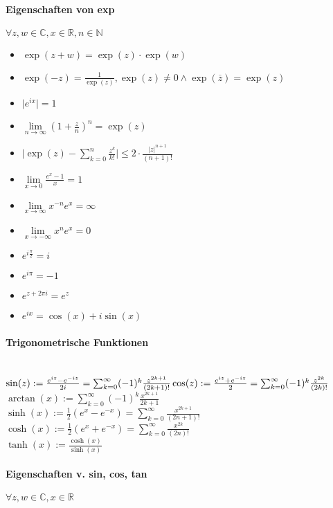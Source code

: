 \documentclass[paper=a3,paper=landscape, fontsize=9pt,DIV=30]{scrartcl}
\newcommand{\real}{{\mathbb{R}}}
\newcommand{\compl}{\mathbb{C}}
\newcommand{\nat}{\mathbb{N}}
\begin{document}
\begin{multicols*}{4}
  \paragraph{Eigenschaften von exp}
  $\forall z,w \in \compl, x \in \real, n \in \nat$
  \begin{itemize}
  \item $\exp(z+w)=\exp(z)\cdot \exp(w)$
  \item $\exp(-z)=\frac{1}{\exp(z)}, \exp(z) \neq 0 \wedge \exp(\overline{z})=\exp(z)$
  \item $\lvert e^{ix} \rvert = 1$
  \item $\lim\limits_{n \rightarrow \infty} (1+\frac{z}{n})^n=\exp(z)$
  \item $ \lvert \exp(z)- \sum_{k=0}^{n} \frac{z^k}{k!} \rvert \leq 2 \cdot \frac{\lvert z \rvert ^{n+1}}{(n+1)!}$
  \item $ \lim\limits_{x \rightarrow 0} \frac{e^x-1}{x} = 1$
  \item $ \lim\limits_{x \rightarrow \infty} x^{-n}e^x=\infty$
  \item $ \lim\limits_{x \rightarrow -\infty} x^ne^x=0$
  \item $e^{i \frac{\pi}{2}} = i$
  \item $e^{i\pi}=-1$
  \item $e^{z+2\pi i}=e^z$
  \item $e^{ix}=\cos(x)+i\sin(x)$
  \end{itemize}


  \paragraph{Trigonometrische Funktionen}\hspace{0pt} \\
  $\sin(z):=\frac{e^{iz}-e^{-iz}}{2i} = \sum_{k=0}^{\infty} (-1)^k \frac{z^{2k+1}}{(2k+1)!}\\
  \cos(z):=\frac{e^{iz}+e^{-iz}}{2} = \sum_{k=0}^{\infty} (-1)^k\frac{z^{2k}}{(2k)!}$\\
  $\arctan(x):=\sum_{k=0}^{\infty}(-1)^k \frac{x^{2k+1}}{2k+1}$\\
  $\sinh(x):=\frac{1}{2}(e^x-e^{-x})=\sum_{k=0}^{\infty}\frac{x^{2k+1}}{(2n+1)!}$\\
  $\cosh(x):=\frac{1}{2}(e^x+e^{-x})=\sum_{k=0}^{\infty}\frac{x^{2k}}{(2n)!}$\\
  $\tanh(x):=\frac{\cosh(x)}{\sinh(x)}$

  \paragraph{Eigenschaften v. sin, cos, tan}
  $\forall z,w \in \compl, x \in \real$


\end{multicols*}
\end{document}

